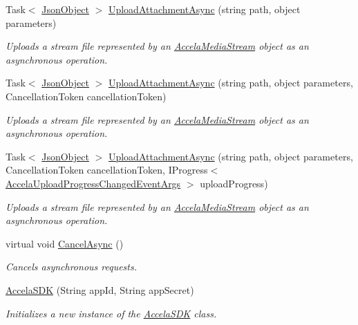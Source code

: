 \begin{DoxyCompactItemize}
\item 
Task$<$ \hyperlink{class_accela_1_1_windows_store_s_d_k_1_1_json_object}{Json\+Object} $>$ \hyperlink{class_accela_1_1_windows_store_s_d_k_1_1_accela_s_d_k_a53ce8cfe1435725fffafe02061903bda}{Upload\+Attachment\+Async} (string path, object parameters)
\begin{DoxyCompactList}\small\item\em Uploads a stream file represented by an \hyperlink{class_accela_1_1_windows_store_s_d_k_1_1_accela_media_stream}{Accela\+Media\+Stream} object as an asynchronous operation. \end{DoxyCompactList}\item 
Task$<$ \hyperlink{class_accela_1_1_windows_store_s_d_k_1_1_json_object}{Json\+Object} $>$ \hyperlink{class_accela_1_1_windows_store_s_d_k_1_1_accela_s_d_k_a7fd56ed340142efb5a4ff527e7f17025}{Upload\+Attachment\+Async} (string path, object parameters, Cancellation\+Token cancellation\+Token)
\begin{DoxyCompactList}\small\item\em Uploads a stream file represented by an \hyperlink{class_accela_1_1_windows_store_s_d_k_1_1_accela_media_stream}{Accela\+Media\+Stream} object as an asynchronous operation. \end{DoxyCompactList}\item 
Task$<$ \hyperlink{class_accela_1_1_windows_store_s_d_k_1_1_json_object}{Json\+Object} $>$ \hyperlink{class_accela_1_1_windows_store_s_d_k_1_1_accela_s_d_k_aad9f2e5a9f8f59692fb78cbf3d51de6d}{Upload\+Attachment\+Async} (string path, object parameters, Cancellation\+Token cancellation\+Token, I\+Progress$<$ \hyperlink{class_accela_1_1_windows_store_s_d_k_1_1_accela_upload_progress_changed_event_args}{Accela\+Upload\+Progress\+Changed\+Event\+Args} $>$ upload\+Progress)
\begin{DoxyCompactList}\small\item\em Uploads a stream file represented by an \hyperlink{class_accela_1_1_windows_store_s_d_k_1_1_accela_media_stream}{Accela\+Media\+Stream} object as an asynchronous operation. \end{DoxyCompactList}\item 
virtual void \hyperlink{class_accela_1_1_windows_store_s_d_k_1_1_accela_s_d_k_aade4b134681bbbbce609dff6a8570861}{Cancel\+Async} ()
\begin{DoxyCompactList}\small\item\em Cancels asynchronous requests. \end{DoxyCompactList}\item 
\hyperlink{class_accela_1_1_windows_store_s_d_k_1_1_accela_s_d_k_aeac8520fb6530fe77307348052b45991}{Accela\+S\+D\+K} (String app\+Id, String app\+Secret)
\begin{DoxyCompactList}\small\item\em Initializes a new instance of the \hyperlink{class_accela_1_1_windows_store_s_d_k_1_1_accela_s_d_k}{Accela\+S\+D\+K} class. \end{DoxyCompactList}\end{DoxyCompactItemize}
